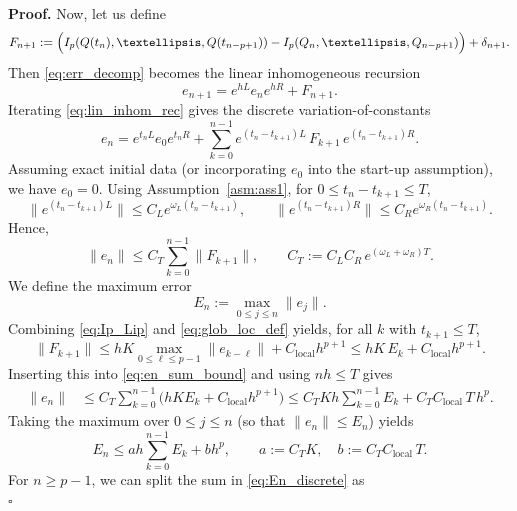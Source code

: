 \documentclass[10pt,a4paper]{amsart}
\newenvironment{pf}{\noindent\textbf{Proof.}}{\hfill$\square$}
\begin{document}
\begin{pf}
Now, let us define 
\begin{equation*}
F_{n+1}
:= \Bigl(I_p(Q(t_n),\ldots,Q(t_{n-p+1}))-I_p(Q_n,\ldots,Q_{n-p+1})\Bigr)+\delta_{n+1}.
\end{equation*}
Then \eqref{eq:err_decomp} becomes the linear inhomogeneous recursion
\begin{equation}\label{eq:lin_inhom_rec}
e_{n+1}=e^{hL}e_ne^{hR}+F_{n+1}.
\end{equation}
Iterating \eqref{eq:lin_inhom_rec} gives the discrete variation-of-constants
\begin{equation*}
e_n
= e^{t_nL}e_0e^{t_nR}
 + \sum_{k=0}^{n-1} e^{(t_n-t_{k+1})L}\,F_{k+1}\,e^{(t_n-t_{k+1})R}.
\end{equation*}
Assuming exact initial data (or incorporating $e_0$ into the start-up assumption), we have $e_0=0$.
Using Assumption~\ref{asm:ass1}, for $0\le t_n-t_{k+1}\le T$,
\begin{equation*}
\|e^{(t_n-t_{k+1})L}\|\le C_L e^{\omega_L (t_n-t_{k+1})},\qquad
\|e^{(t_n-t_{k+1})R}\|\le C_R e^{\omega_R (t_n-t_{k+1})}.
\end{equation*}
Hence,
\begin{equation}\label{eq:en_sum_bound}
\|e_n\|
\le C_T\sum_{k=0}^{n-1}\|F_{k+1}\|,
\qquad
C_T:=C_LC_R\,e^{(\omega_L+\omega_R)T}.
\end{equation}
We define the maximum error
\begin{equation*}
   E_n:=\max_{0\le j\le n}\|e_j\|. 
\end{equation*}
Combining \eqref{eq:Ip_Lip} and \eqref{eq:glob_loc_def} yields, for all $k$ with $t_{k+1}\le T$,
\begin{equation*}
\|F_{k+1}\|\le hK\max_{0\le\ell\le p-1}\|e_{k-\ell}\| + C_{\mathrm{local}}h^{p+1}
\le hK\,E_k + C_{\mathrm{local}}h^{p+1}.
\end{equation*}
Inserting this into \eqref{eq:en_sum_bound} and using $nh\le T$ gives
\begin{align*}
\|e_n\|
&\le C_T\sum_{k=0}^{n-1}\bigl(hK E_k + C_{\mathrm{local}}h^{p+1}\bigr)
\le C_TK h\sum_{k=0}^{n-1}E_k + C_T C_{\mathrm{local}}\,T\,h^p.
\end{align*}
Taking the maximum over $0\le j\le n$ (so that $\|e_n\|\le E_n$) yields
\begin{equation}\label{eq:En_discrete}
E_n \le a h\sum_{k=0}^{n-1}E_k + b h^p,
\qquad
a:=C_TK,\quad b:=C_T C_{\mathrm{local}}\,T.
\end{equation}
For $n\ge p-1$, we can split the sum in \eqref{eq:En_discrete} as
\begin{equation*}

\end{equation*}
\end{pf}
\end{document}
